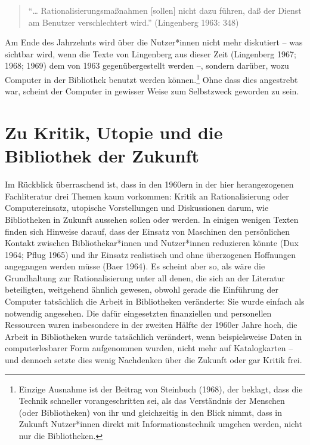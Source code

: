 \documentclass[a4paper,
fontsize=11pt,
oneside,
numbers=noperiodatend,
parskip=half-,
bibliography=totoc,
final
]{scrartcl}
\begin{document}
\begin{quote}
\enquote{\ldots{} Rationalisierungsmaßnahmen {[}sollen{]} nicht dazu führen, daß
der Dienst am Benutzer verschlechtert wird.} (Lingenberg 1963: 348)
\end{quote}

Am Ende des Jahrzehnts wird über die Nutzer*innen nicht mehr diskutiert
-- was sichtbar wird, wenn die Texte von Lingenberg aus dieser Zeit
(Lingenberg 1967; 1968; 1969) dem von 1963 gegenübergestellt werden --,
sondern darüber, wozu Computer in der Bibliothek benutzt werden
können.\footnote{Einzige Ausnahme ist der Beitrag von Steinbuch (1968),
  der beklagt, dass die Technik schneller vorangeschritten sei, als das
  Verständnis der Menschen (oder Bibliotheken) von ihr und gleichzeitig
  in den Blick nimmt, dass in Zukunft Nutzer*innen direkt mit
  Informationstechnik umgehen werden, nicht nur die Bibliotheken.} Ohne
dass dies angestrebt war, scheint der Computer in gewisser Weise zum
Selbstzweck geworden zu sein.

\hypertarget{zu-kritik-utopie-und-die-bibliothek-der-zukunft}{%
\section{Zu Kritik, Utopie und die Bibliothek der
Zukunft}\label{zu-kritik-utopie-und-die-bibliothek-der-zukunft}}

Im Rückblick überraschend ist, dass in den 1960ern in der hier
herangezogenen Fachliteratur drei Themen kaum vorkommen: Kritik an
Rationalisierung oder Computereinsatz, utopische Vorstellungen und
Diskussionen darum, wie Bibliotheken in Zukunft aussehen sollen oder
werden. In einigen wenigen Texten finden sich Hinweise darauf, dass der
Einsatz von Maschinen den persönlichen Kontakt zwischen
Bibliothekar*innen und Nutzer*innen reduzieren könnte (Dux 1964; Pflug
1965) und ihr Einsatz realistisch und ohne überzogenen Hoffnungen
angegangen werden müsse (Baer 1964). Es scheint aber so, als wäre die
Grundhaltung zur Rationalisierung unter all denen, die sich an der
Literatur beteiligten, weitgehend ähnlich gewesen, obwohl gerade die
Einführung der Computer tatsächlich die Arbeit in Bibliotheken
veränderte: Sie wurde einfach als notwendig angesehen. Die dafür
eingesetzten finanziellen und personellen Ressourcen waren insbesondere
in der zweiten Hälfte der 1960er Jahre hoch, die Arbeit in Bibliotheken
wurde tatsächlich verändert, wenn beispielsweise Daten in
computerlesbarer Form aufgenommen wurden, nicht mehr auf Katalogkarten
-- und dennoch setzte dies wenig Nachdenken über die Zukunft oder gar
Kritik frei.
\end{document}
